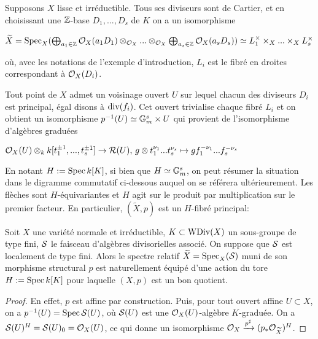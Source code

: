 \begin{rem}\label{lisseGoodQuotient}
Supposons $X$ lisse et irréductible. Tous ses diviseurs sont de Cartier, et en choisissant une $\mathbb{Z}$-base $D_1,...,D_s$ de $K$ on a un isomorphisme
\begin{center}
$\widetilde{X}=\operatorname{Spec}_X(\bigoplus_{a_1\in\mathbb{Z}}\mathcal{O}_X(a_1D_1)\otimes_{\mathcal{O}_X}...\otimes_{\mathcal{O}_X}\bigoplus_{a_s\in\mathbb{Z}}\mathcal{O}_X(a_sD_s))\simeq L_1^\times\times_X...\times_X L_s^\times$
\end{center}
où, avec les notations de l'exemple d'introduction, $L_i$ est le fibré en droites correspondant à $\mathcal{O}_X(D_i)$. 

Tout point de $X$ admet un voisinage ouvert $U$ sur lequel chacun des diviseurs $D_i$ est principal, égal disons à $\operatorname{div}(f_i)$. Cet ouvert trivialise chaque fibré $L_i$ et on obtient un isomorphisme $p^{-1}(U)\simeq \mathbb{G}_m^s\times U$ qui provient de l'isomorphisme d'algèbres graduées
\begin{center}
$\mathcal{O}_X(U)\otimes_k k[t_1^{\pm 1},...,t_s^{\pm 1}] \rightarrow \mathcal{R}(U),\, g\otimes t_1^{\nu_1}...t_s^{\nu_s}\mapsto gf_1^{-\nu_1}...f_s^{-\nu_s}$
\end{center}

En notant $H:=\operatorname{Spec} k[K]$, si bien que $H\simeq \mathbb{G}_m^s$, on peut résumer la situation dans le digramme commutatif ci-dessous auquel on se référera ultérieurement. Les flèches sont $H$-équivariantes et $H$ agit sur le produit par multiplication sur le premier facteur. En particulier, $(\widetilde{X},p)$ est un $H$-fibré principal:
\begin{center}
\end{center}
\end{rem}



\begin{cons}\label{specrelatifdivi}
Soit $X$ une variété normale et irréductible, $K\subset \operatorname{WDiv}(X)$ un sous-groupe de type fini, $\mathcal{S}$ le faisceau d'algèbres divisorielles associé. On suppose que $\mathcal{S}$ est localement de type fini. Alors le spectre relatif $\widetilde{X}=\operatorname{Spec}_X(\mathcal{S})$ muni de son morphisme structural $p$ est naturellement équipé d'une action du tore $H:=\operatorname{Spec} k[K]$ pour laquelle $(X,p)$ est un bon quotient.
\end{cons}
\begin{proof}
En effet, $p$ est affine par construction. Puis, pour tout ouvert affine $U\subset X$, on a $p^{-1}(U)=\operatorname{Spec} \mathcal{S}(U)$, où $\mathcal{S}(U)$ est une $\mathcal{O}_X(U)$-algèbre $K$-graduée. On a $\mathcal{S}(U)^H=\mathcal{S}(U)_0=\mathcal{O}_X(U)$, ce qui donne un isomorphisme $\mathcal{O}_X \xrightarrow{p^\sharp} (p_*\mathcal{O}_{\widetilde{X}})^H$.
\end{proof}

